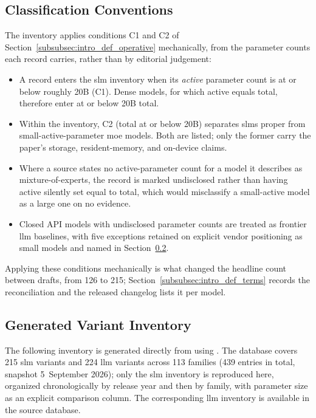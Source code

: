 \subsection{Classification Conventions}
\label{subsec:ecosystem_classification}
The inventory applies conditions C1 and C2 of Section~\ref{subsubsec:intro_def_operative} mechanically, from the parameter counts each record carries, rather than by editorial judgement:
\begin{itemize}
    \item A record enters the \gls{slm} inventory when its \emph{active} parameter count is at or below roughly 20B (C1). Dense models, for which active equals total, therefore enter at or below 20B total.
    \item Within the inventory, C2 (total at or below 20B) separates \glspl{slm} proper from small-active-parameter \gls{moe} models. Both are listed; only the former carry the paper's storage, resident-memory, and on-device claims.
    \item Where a source states no active-parameter count for a model it describes as mixture-of-experts, the record is marked undisclosed rather than having active silently set equal to total, which would misclassify a small-active model as a large one on no evidence.
    \item Closed API models with undisclosed parameter counts are treated as frontier \gls{llm} baselines, with five exceptions retained on explicit vendor positioning as small models and named in Section~\ref{subsec:ecosystem_generated_inventory}.
\end{itemize}

Applying these conditions mechanically is what changed the headline count between drafts, from 126 to 215; Section~\ref{subsubsec:intro_def_terms} records the reconciliation and the released changelog lists it per model.

\subsection{Generated Variant Inventory}
\label{subsec:ecosystem_generated_inventory}
The following inventory is generated directly from  using . The database covers 215 \gls{slm} variants and 224 \gls{llm} variants across 113 families (439 entries in total, snapshot 5~September 2026); only the \gls{slm} inventory is reproduced here, organized chronologically by release year and then by family, with parameter size as an explicit comparison column. The corresponding \gls{llm} inventory is available in the source database.

